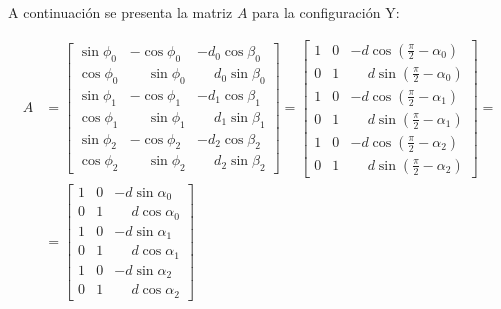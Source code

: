 \documentclass[11pt,a4paper]{article}
\begin{document}
A continuación se presenta la matriz \(A\) para la configuración Y:

\begin{equation}
    \begin{aligned}
        A & = \begin{bmatrix}
                  \sin\phi_0 & -\cos\phi_0           & -d_0\cos\beta_0           \\
                  \cos\phi_0 & \phantom{-}\sin\phi_0 & \phantom{-}d_0\sin\beta_0 \\
                  \sin\phi_1 & -\cos\phi_1           & -d_1\cos\beta_1           \\
                  \cos\phi_1 & \phantom{-}\sin\phi_1 & \phantom{-}d_1\sin\beta_1 \\
                  \sin\phi_2 & -\cos\phi_2           & -d_2\cos\beta_2           \\
                  \cos\phi_2 & \phantom{-}\sin\phi_2 & \phantom{-}d_2\sin\beta_2
              \end{bmatrix} = \begin{bmatrix}
                                  1 & 0 & -d\cos\left(\frac{\pi}{2} - \alpha_0\right)           \\
                                  0 & 1 & \phantom{-}d\sin\left(\frac{\pi}{2} - \alpha_0\right) \\
                                  1 & 0 & -d\cos\left(\frac{\pi}{2} - \alpha_1\right)           \\
                                  0 & 1 & \phantom{-}d\sin\left(\frac{\pi}{2} - \alpha_1\right) \\
                                  1 & 0 & -d\cos\left(\frac{\pi}{2} - \alpha_2\right)           \\
                                  0 & 1 & \phantom{-}d\sin\left(\frac{\pi}{2} - \alpha_2\right)
                              \end{bmatrix}  = \\
          & = \begin{bmatrix}
                  1 & 0 & -d\sin\alpha_0           \\
                  0 & 1 & \phantom{-}d\cos\alpha_0 \\
                  1 & 0 & -d\sin\alpha_1           \\
                  0 & 1 & \phantom{-}d\cos\alpha_1 \\
                  1 & 0 & -d\sin\alpha_2           \\
                  0 & 1 & \phantom{-}d\cos\alpha_2

\end{bmatrix}
\end{aligned}
\end{equation}
\end{document}
